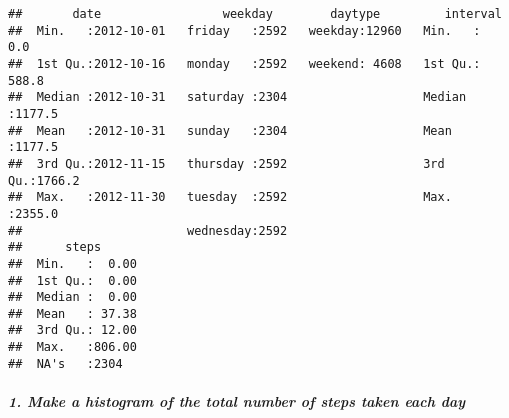 \documentclass[]{article}
\let\oldsubparagraph\subparagraph
\renewcommand{\subparagraph}[1]{\oldsubparagraph{#1}\mbox{}}
\begin{document}
\begin{verbatim}
##       date                 weekday        daytype         interval     
##  Min.   :2012-10-01   friday   :2592   weekday:12960   Min.   :   0.0  
##  1st Qu.:2012-10-16   monday   :2592   weekend: 4608   1st Qu.: 588.8  
##  Median :2012-10-31   saturday :2304                   Median :1177.5  
##  Mean   :2012-10-31   sunday   :2304                   Mean   :1177.5  
##  3rd Qu.:2012-11-15   thursday :2592                   3rd Qu.:1766.2  
##  Max.   :2012-11-30   tuesday  :2592                   Max.   :2355.0  
##                       wednesday:2592                                   
##      steps       
##  Min.   :  0.00  
##  1st Qu.:  0.00  
##  Median :  0.00  
##  Mean   : 37.38  
##  3rd Qu.: 12.00  
##  Max.   :806.00  
##  NA's   :2304
\end{verbatim}

\subparagraph{1. Make a histogram of the total number of steps taken
each
day}\label{make-a-histogram-of-the-total-number-of-steps-taken-each-day}
\end{document}
